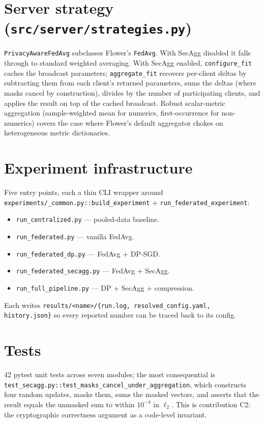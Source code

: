 \documentclass[11pt,a4paper]{report}
\begin{document}
\section{Server strategy (\texttt{src/server/strategies.py})}\label{sec:method-strategy}

\texttt{PrivacyAwareFedAvg} subclasses Flower's \texttt{FedAvg}. With SecAgg
disabled it falls through to standard weighted averaging. With SecAgg
enabled, \texttt{configure\_fit} caches the broadcast parameters;
\texttt{aggregate\_fit} recovers per-client deltas by subtracting them from
each client's returned parameters, sums the deltas (where masks cancel by
construction), divides by the number of participating clients, and applies
the result on top of the cached broadcast. Robust scalar-metric aggregation
(sample-weighted mean for numerics, first-occurrence for non-numerics)
covers the case where Flower's default aggregator chokes on
heterogeneous metric dictionaries.

\section{Experiment infrastructure}

Five entry points, each a thin CLI wrapper around
\texttt{experiments/\_common.py::build\_experiment} +
\texttt{run\_federated\_experiment}:

\begin{itemize}[leftmargin=*]
  \item \texttt{run\_centralized.py} --- pooled-data baseline.
  \item \texttt{run\_federated.py} --- vanilla FedAvg.
  \item \texttt{run\_federated\_dp.py} --- FedAvg + DP-SGD.
  \item \texttt{run\_federated\_secagg.py} --- FedAvg + SecAgg.
  \item \texttt{run\_full\_pipeline.py} --- DP + SecAgg + compression.
\end{itemize}

Each writes \texttt{results/<name>/\{run.log, resolved\_config.yaml,
history.json\}} so every reported number can be traced back to its config.

\section{Tests}\label{sec:method-tests}

42 pytest unit tests across seven modules; the most consequential is
\texttt{test\_secagg.py::test\_masks\_cancel\_under\_aggregation}, which
constructs four random updates, masks them, sums the masked vectors,
and asserts that the result equals the unmasked sum to within
$10^{-4}$ in $\ell_2$. This is contribution C2: the cryptographic
correctness argument as a code-level invariant.
\end{document}
